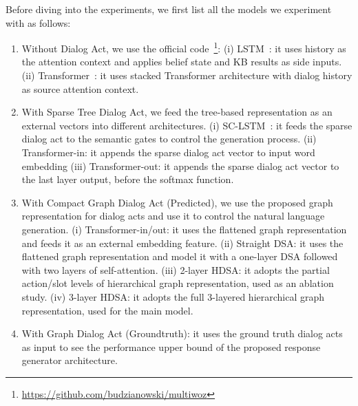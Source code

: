 \documentclass[11pt,a4paper]{article}
\begin{document}
Before diving into the experiments, we first list all the models we experiment with as follows:
\begin{enumerate}[partopsep=0pt, leftmargin=0.5cm]
    \item Without Dialog Act, we use the official code~\footnote{\url{https://github.com/budzianowski/multiwoz}}:
    (i) LSTM~\cite{DBLP:conf/emnlp/BudzianowskiWTC18}: it uses history as the attention context and applies belief state and KB results as side inputs. (ii) Transformer~\cite{vaswani2017attention}: it uses stacked Transformer architecture with dialog history as source attention context.
    \item With Sparse Tree Dialog Act, we feed the tree-based representation as an external vectors into different architectures.
    (i) SC-LSTM~\cite{DBLP:conf/emnlp/WenGMSVY15}: it feeds the sparse dialog act to the semantic gates to control the generation process.
    (ii) Transformer-in: it appends the sparse dialog act vector to input word embedding
    (iii) Transformer-out: it appends the sparse dialog act vector to the last layer output, before the softmax function.
    \item With Compact Graph Dialog Act (Predicted), we use the proposed graph representation for dialog acts and use it to control the natural language generation.
    (i) Transformer-in/out: it uses the flattened graph representation and feeds it as an external embedding feature.
    (ii) Straight DSA: it uses the flattened graph representation and model it with a one-layer DSA followed with two layers of self-attention.
    (iii) 2-layer HDSA: it adopts the partial action/slot levels of hierarchical graph representation, used as an ablation study.
    (iv) 3-layer HDSA: it adopts the full 3-layered hierarchical graph representation, used for the main model.
    \item With Graph Dialog Act (Groundtruth): it uses the ground truth dialog acts as input to see the performance upper bound of the proposed response generator architecture.
\end{enumerate}
\end{document}
